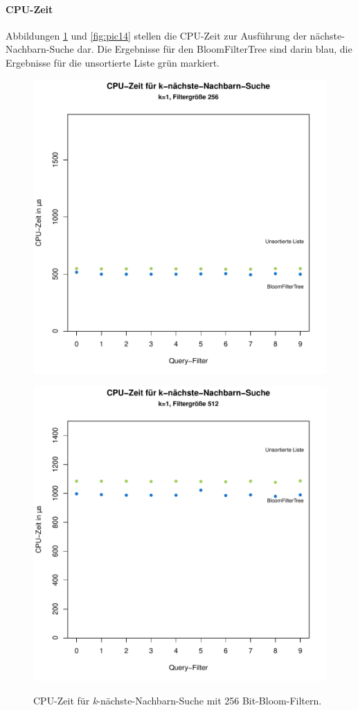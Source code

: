 \paragraph*{CPU-Zeit}
Abbildungen \ref{fig:pic13} und \ref{fig:pic14} stellen die CPU-Zeit zur Ausführung der nächste-Nachbarn-Suche dar. Die Ergebnisse für den BloomFilterTree sind darin blau, die Ergebnisse für die unsortierte Liste grün markiert.  
\begin{figure}[hptb]
	\centering
	\includegraphics[scale=0.7]{pictures/cputime_nn_256.pdf}\\
	\caption[CPU-Zeit für nächste-Nachbarn-Suche mit 256 Bit-Bloom-Filtern]{CPU-Zeit für \textit{k}-nächste-Nachbarn-Suche mit 256 Bit-Bloom-Filtern.}\label{fig:pic13}
	\includegraphics[scale=0.7]{pictures/cputime_nn_512.pdf}\\

\end{figure}

